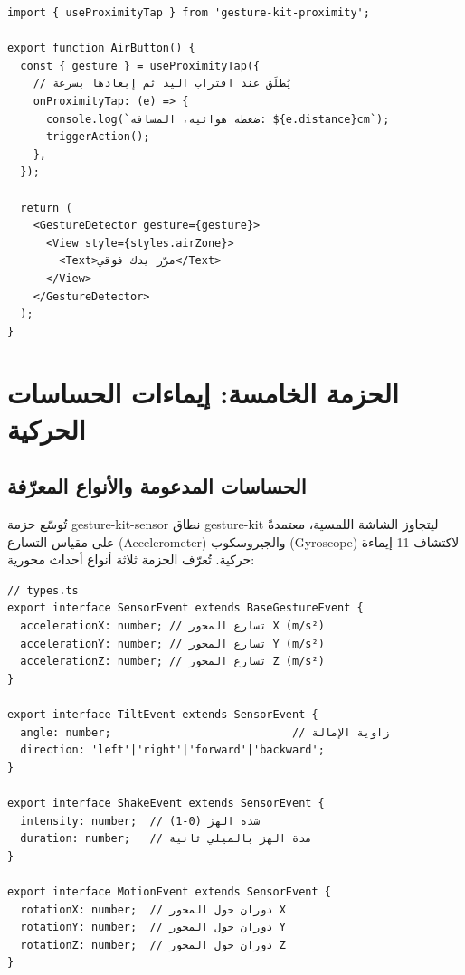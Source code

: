 \begin{Arabic}
\begin{english}
\begin{verbatim}
import { useProximityTap } from 'gesture-kit-proximity';

export function AirButton() {
  const { gesture } = useProximityTap({
    // يُطلَق عند اقتراب اليد ثم إبعادها بسرعة
    onProximityTap: (e) => {
      console.log(`ضغطة هوائية، المسافة: ${e.distance}cm`);
      triggerAction();
    },
  });

  return (
    <GestureDetector gesture={gesture}>
      <View style={styles.airZone}>
        <Text>مرّر يدك فوقي</Text>
      </View>
    </GestureDetector>
  );
}
\end{verbatim}
\end{english}

\section{الحزمة الخامسة: إيماءات الحساسات الحركية}

\subsection{الحساسات المدعومة والأنواع المعرّفة}

تُوسّع حزمة \textenglish{gesture-kit-sensor} نطاق \textenglish{gesture-kit} ليتجاوز الشاشة اللمسية، معتمدةً على مقياس التسارع (\textenglish{Accelerometer}) والجيروسكوب (\textenglish{Gyroscope}) لاكتشاف 11 إيماءة حركية. تُعرّف الحزمة ثلاثة أنواع أحداث محورية:

\begin{english}
\begin{verbatim}
// types.ts
export interface SensorEvent extends BaseGestureEvent {
  accelerationX: number; // تسارع المحور X (m/s²)
  accelerationY: number; // تسارع المحور Y (m/s²)
  accelerationZ: number; // تسارع المحور Z (m/s²)
}

export interface TiltEvent extends SensorEvent {
  angle: number;                            // زاوية الإمالة
  direction: 'left'|'right'|'forward'|'backward';
}

export interface ShakeEvent extends SensorEvent {
  intensity: number;  // شدة الهز (0-1)
  duration: number;   // مدة الهز بالميلي ثانية
}

export interface MotionEvent extends SensorEvent {
  rotationX: number;  // دوران حول المحور X
  rotationY: number;  // دوران حول المحور Y
  rotationZ: number;  // دوران حول المحور Z
}
\end{verbatim}
\end{english}


\end{Arabic}
